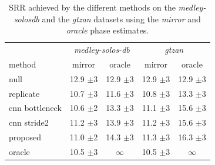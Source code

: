 \documentclass{article}
\newcommand{\ml}[1]{\textcolor{blue}{ML : #1}}
\begin{document}

\begin{table}
  \caption{SRR achieved by the different methods on the \textit{medley-solosdb} and the \textit{gtzan} datasets using the \textit{mirror} and \textit{oracle} phase estimates.}
  \label{tab:SRR}
  \begin{center}
\begin{tabular}{lcc|cc}
  & \multicolumn{2}{c|}{\textit{medley-solos-db}} & \multicolumn{2}{c}{\textit{gtzan}} \\
  method & mirror & oracle & mirror & oracle \\
\hline
null & 12.9 $\pm$3 & 12.9 $\pm$3 & 12.9 $\pm$3 &  12.9 $\pm$3\\
replicate & 10.7 $\pm$3 & 11.6 $\pm$3 & 10.8 $\pm$3 & 13.3 $\pm$3\\
\hline
cnn bottleneck & 10.6 $\pm$2 &  13.3 $\pm$3 & 11.1 $\pm$3 & 15.6 $\pm$3 \\
cnn stride2 & 11.2 $\pm$3 & 13.9 $\pm$3 & 11.2 $\pm$3 & 15.6 $\pm$3 \\
\hline
proposed  & 11.0 $\pm$2 & 14.3 $\pm$3  & 11.3 $\pm$3 & 16.3 $\pm$3 \\
\hline
oracle & 10.5 $\pm$3 & $\infty$ & 10.5 $\pm$3 & $\infty$ \\
\end{tabular}
\end{center}
\vspace{-4mm}
\end{table}

\end{document}
